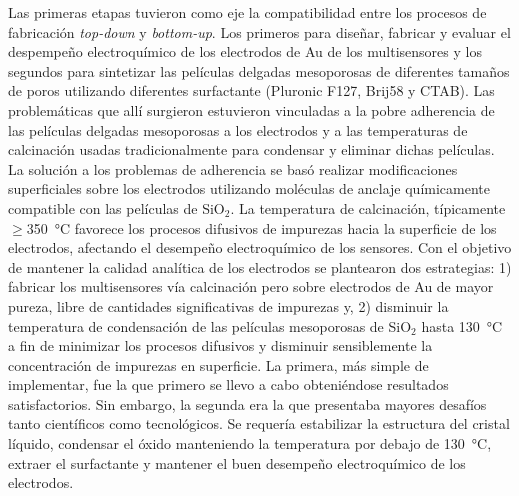 Las primeras etapas tuvieron como eje la compatibilidad entre los procesos de fabricación \textit{top-down} y \textit{bottom-up}. Los primeros para diseñar, fabricar y evaluar el despempeño electroquímico de los electrodos de Au de los multisensores y los segundos para sintetizar las películas delgadas mesoporosas de diferentes tamaños de poros utilizando diferentes surfactante (Pluronic F127, Brij58 y CTAB). Las problemáticas que allí surgieron estuvieron vinculadas a la pobre adherencia de las películas delgadas mesoporosas a los electrodos y a las temperaturas de calcinación usadas tradicionalmente para condensar y eliminar dichas películas. La solución a los problemas de adherencia se basó realizar modificaciones superficiales sobre los electrodos utilizando moléculas de anclaje químicamente compatible con las películas de SiO$_2$. La temperatura de calcinación, típicamente $\geq$\SI{350}{\celsius} favorece los procesos difusivos de impurezas hacia la superficie de los electrodos, afectando el desempeño electroquímico de los sensores. Con el objetivo de mantener la calidad analítica de los electrodos se plantearon dos estrategias: 1) fabricar los multisensores vía calcinación pero sobre electrodos de Au de mayor pureza, libre de cantidades significativas de impurezas y, 2) disminuir la temperatura de condensación de las películas mesoporosas de SiO$_2$ hasta \SI{130}{\celsius} a fin de minimizar los procesos difusivos y disminuir sensiblemente la concentración de impurezas en superficie. La primera, más simple de implementar, fue la que primero se llevo a cabo obteniéndose resultados satisfactorios. Sin embargo, la segunda era la que presentaba mayores desafíos tanto científicos como tecnológicos. Se requería estabilizar la estructura del cristal líquido, condensar el óxido manteniendo la temperatura por debajo de \SI{130}{\celsius}, extraer el surfactante y mantener el buen desempeño electroquímico de los electrodos.  

